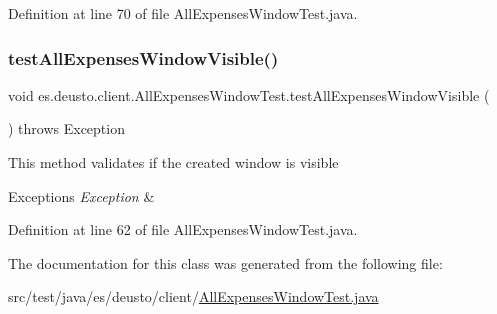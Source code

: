 Definition at line 70 of file All\+Expenses\+Window\+Test.\+java.

\mbox{\label{classes_1_1deusto_1_1client_1_1_all_expenses_window_test_a1eb6a11013fb12fe16453a17e050e81c}} 
\subsubsection{\texorpdfstring{test\+All\+Expenses\+Window\+Visible()}{testAllExpensesWindowVisible()}}
{\footnotesize\ttfamily void es.\+deusto.\+client.\+All\+Expenses\+Window\+Test.\+test\+All\+Expenses\+Window\+Visible (\begin{DoxyParamCaption}{ }\end{DoxyParamCaption}) throws Exception}

This method validates if the created window is visible 
\begin{DoxyExceptions}{Exceptions}
{\em Exception} & \\
\hline
\end{DoxyExceptions}


Definition at line 62 of file All\+Expenses\+Window\+Test.\+java.



The documentation for this class was generated from the following file\+:\begin{DoxyCompactItemize}
\item 
src/test/java/es/deusto/client/\hyperlink{_all_expenses_window_test_8java}{All\+Expenses\+Window\+Test.\+java}\end{DoxyCompactItemize}
